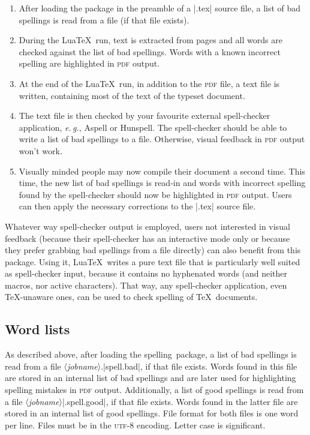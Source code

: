 \documentclass[11pt]{article}
\newcommand*{\pkg}{\textsf{spelling}}
\newcommand*{\acr}[1]{\mbox{\scshape#1}}
\newcommand*{\descr}[1]{〈\emph{#1}〉}
\newcommand*{\latinphrase}[1]{\foreignlanguage{latin}{\emph{#1}}}
\newcommand*{\lpeg}{\latinphrase{e.\,g.}\xspace}
\begin{document}
\begin{enumerate}

\item After loading the package in the preamble of a |.tex| source file,
  a list of bad spellings is read from a file (if that file exists).

\item During the Lua\TeX\ run, text is extracted from pages and all
  words are checked against the list of bad spellings.  Words with a
  known incorrect spelling are highlighted in \acr{pdf} output.

\item At the end of the Lua\TeX\ run, in addition to the \acr{pdf} file,
  a text file is written, containing most of the text of the typeset
  document.

\item The text file is then checked by your favourite external
  spell-checker application, \lpeg, Aspell or Hunspell.  The
  spell-checker should be able to write a list of bad spellings to a
  file.  Otherwise, visual feedback in \acr{pdf} output won't work.

\item Visually minded people may now compile their document a second
  time.  This time, the new list of bad spellings is read-in and words
  with incorrect spelling found by the spell-checker should now be
  highlighted in \acr{pdf} output.  Users can then apply the necessary
  corrections to the |.tex| source file.

\end{enumerate}

Whatever way spell-checker output is employed, users not interested in
visual feedback (because their spell-checker has an interactive mode
only or because they prefer grabbing bad spellings from a file directly)
can also benefit from this package.  Using it, Lua\TeX\ writes a pure
text file that is particularly well suited as spell-checker input,
because it contains no hyphenated words (and neither macros, nor active
characters).  That way, any spell-checker application, even \TeX-unaware
ones, can be used to check spelling of \TeX\ documents.


\subsection{Word lists}
\label{sec:wordlists}

As described above, after loading the \pkg\ package, a list of bad
spellings is read from a file \descr{jobname}.|spell.bad|, if that file
exists.  Words found in this file are stored in an internal list of bad
spellings and are later used for highlighting spelling mistakes in
\acr{pdf} output.  Additionally, a list of good spellings is read from a
file \descr{jobname}|.spell.good|, if that file exists.  Words found in
the latter file are stored in an internal list of good spellings.  File
format for both files is one word per line.  Files must be in the
\acr{utf-8} encoding.  Letter case is significant.
\end{document}
